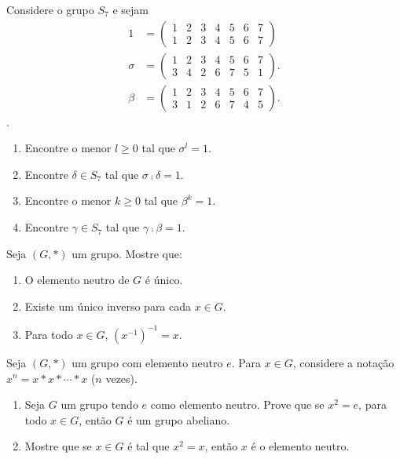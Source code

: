 \documentclass[12pt]{exam}
\begin{document}
    \questao{} Considere o grupo $S_7$ e sejam
    \begin{align*}
        1 &= \begin{pmatrix}
            1 & 2 & 3 & 4 & 5 & 6 & 7\\
            1 & 2 & 3 & 4 & 5 & 6 & 7
        \end{pmatrix}\\
        \sigma &= \begin{pmatrix}
                1 & 2 & 3 & 4 & 5 & 6 & 7\\
                3 & 4 & 2 & 6 & 7 & 5 & 1
            \end{pmatrix}.\\
        \beta &= \begin{pmatrix}
                1 & 2 & 3 & 4 & 5 & 6 & 7\\
                3 & 1 & 2 & 6 & 7 & 4 & 5
            \end{pmatrix}.
    \end{align*}.
    \begin{enumerate}[label=({\alph*})]
        \item Encontre o menor $l \ge 0$ tal que $\sigma^l = 1$.
        \item Encontre $\delta \in S_7$ tal que $\sigma\comp\delta = 1$.
        \item Encontre o menor $k \ge 0$ tal que $\beta^k = 1$.
        \item Encontre $\gamma \in S_7$ tal que $\gamma\comp\beta = 1$.
    \end{enumerate}

    \vspace{.3cm}

    \questao{} Seja $(G,*)$ um grupo. Mostre que:
    \begin{enumerate}[label={\alph*})]
        \item O elemento neutro de $G$ {\'e} {\'u}nico.

        \item Existe um {\'u}nico inverso para cada $x \in G$.

        \item Para todo $x \in G$, $(x^{-1})^{-1} = x$.
    \end{enumerate}

    \newpage

    \questao{} Seja $(G,*)$ um grupo com elemento neutro $e$. Para $x\in
    G$, considere a nota{\c c}{\~a}o $x^n=x*x*\cdots *x$ ($n$ vezes).
    \begin{enumerate}[label=({\alph*})]
    \item Seja $G$ um grupo tendo $e$ como elemento neutro. Prove que se
    $x^2=e$, para todo $x\in G$, ent{\~a}o $G$ {\'e} um grupo abeliano.
    \item Mostre que se $x\in G$ {\'e} tal que $x^2=x$, ent{\~a}o $x$ {\'e} o elemento neutro.
    \end{enumerate}
\end{document}
